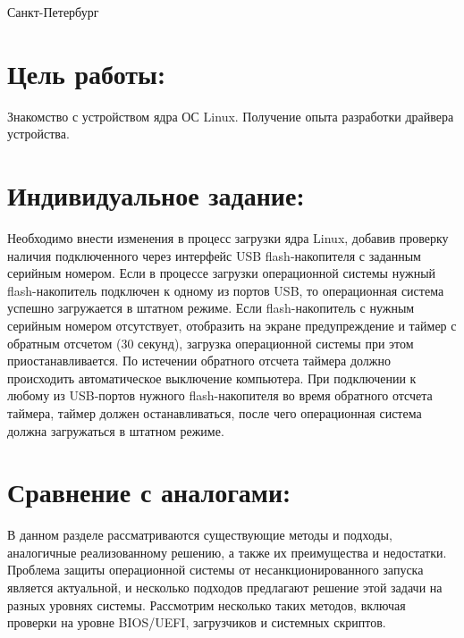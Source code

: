 \documentclass[12pt]{article}
\begin{document}


\vspace{\baselineskip}
\vspace{\baselineskip}
\vspace{\baselineskip}
\vspace{\baselineskip}
\vspace{\baselineskip}
\begin{Center}
Санкт-Петербург \the\year{}
\end{Center}\par

\newpage

\section*{Цель работы:}
Знакомство с устройством ядра ОС Linux. Получение опыта разработки драйвера устройства.

\section*{Индивидуальное задание:}
Необходимо внести изменения в процесс загрузки ядра Linux, добавив проверку наличия подключенного через интерфейс USB flash-накопителя с заданным серийным номером. Если в процессе загрузки операционной системы нужный flash-накопитель подключен к одному из портов USB, то операционная система успешно загружается в штатном режиме. Если flash-накопитель с нужным серийным номером отсутствует, отобразить на экране предупреждение и таймер с обратным отсчетом (30 секунд), загрузка операционной системы при этом приостанавливается. По истечении обратного отсчета таймера должно происходить автоматическое выключение компьютера. При подключении к любому из USB-портов нужного flash-накопителя во время обратного отсчета таймера, таймер должен останавливаться, после чего операционная система должна загружаться в штатном режиме.

\section*{Сравнение с аналогами:}

В данном разделе рассматриваются существующие методы и подходы, аналогичные реализованному решению, а также их преимущества и недостатки. Проблема защиты операционной системы от несанкционированного запуска является актуальной, и несколько подходов предлагают решение этой задачи на разных уровнях системы. Рассмотрим несколько таких методов, включая проверки на уровне BIOS/UEFI, загрузчиков и системных скриптов.
\end{document}
